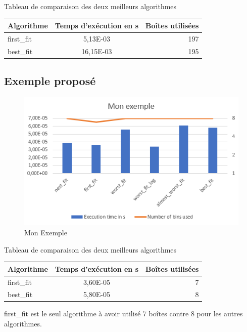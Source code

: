 \documentclass{article}
\begin{document}
\begin{center}
Tableau de comparaison des deux meilleurs algorithmes

\begin{tabular}{|l|c|r|}
  \hline
  Algorithme & Temps d'exécution en s & Boîtes utilisées \\
  \hline
  first\_fit & 5,13E-03 & 197 \\
  best\_fit & 16,15E-03  & 195 \\
  \hline
\end{tabular}
\end{center}

\clearpage
\subsection{Exemple proposé}

\begin{figure}[h]
\begin{center}
\includegraphics{monexemple.png}
\end{center}
\caption{Mon Exemple}
\end{figure}

\begin{center}
Tableau de comparaison des deux meilleurs algorithmes

\begin{tabular}{|l|c|r|}
  \hline
  Algorithme & Temps d'exécution en s & Boîtes utilisées \\
  \hline
  first\_fit & 3,60E-05  & 7 \\
  best\_fit & 5,80E-05  & 8 \\
  \hline
\end{tabular}
\end{center}


first\_fit est le seul algorithme à avoir utilisé 7 boîtes contre 8 pour les autres algorithmes.
\end{document}
